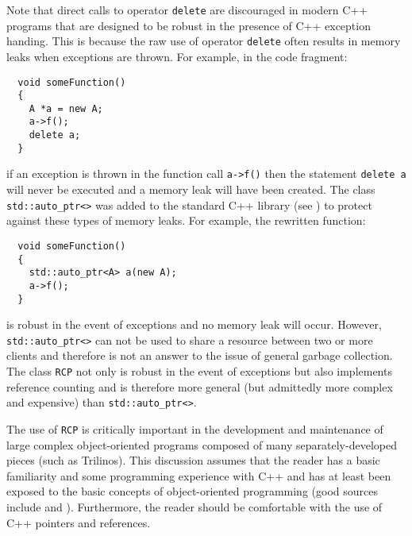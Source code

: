 \documentclass[pdf,ps2pdf,11pt]{SANDreport}
\begin{document}
Note that direct calls to operator {}\texttt{delete} are discouraged
in modern C++ programs that are designed to be robust in the presence
of C++ exception handing.  This is because the raw use of operator
{}\texttt{delete} often results in memory leaks when exceptions are
thrown.  For example, in the code fragment:

{\small\begin{verbatim}
  void someFunction()
  {
    A *a = new A;
    a->f();
    delete a;
  }
\end{verbatim}}

{}\noindent{}if an exception is thrown in the function call
{}\texttt{a->f()} then the statement {}\texttt{delete a} will never be
executed and a memory leak will have been created.  The class
{}\texttt{std::auto\_\-ptr<>} was added to the standard C++ library
(see {}\cite[Items 9 and 10]{ref:meyers_1996}) to protect against
these types of memory leaks.  For example, the rewritten function:

{\small\begin{verbatim}
  void someFunction()
  {
    std::auto_ptr<A> a(new A);
    a->f();
  }
\end{verbatim}}

{}\noindent{}is robust in the event of exceptions and no memory leak
will occur.  However, {}\texttt{std::auto\_\-ptr<>} can not be used to
share a resource between two or more clients and therefore is not an
answer to the issue of general garbage collection.  The class
{}\texttt{RCP} not only is robust in the event of
exceptions but also implements reference counting and is therefore
more general (but admittedly more complex and expensive) than
{}\texttt{std::auto\_\-ptr<>}.

The use of {}\texttt{RCP} is critically important in the
development and maintenance of large complex object-oriented programs
composed of many separately-developed pieces (such as Trilinos).  This
discussion assumes that the reader has a basic familiarity and some
programming experience with C++ and has at least been exposed to the
basic concepts of object-oriented programming (good sources include
{}\cite{ref:gama_et_al_1995} and {}\cite{ref:stroustrup_2000}).
Furthermore, the reader should be comfortable with the use of C++
pointers and references.
\end{document}
